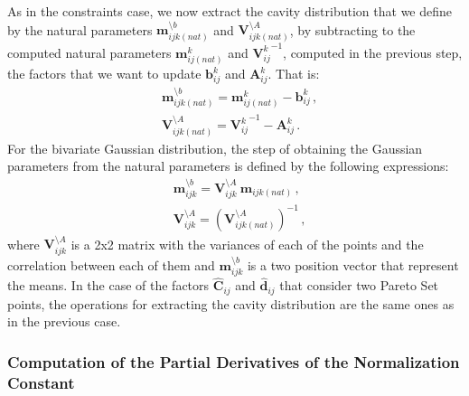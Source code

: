 As in the constraints case, we now extract the cavity distribution that we define by the natural parameters $\boldsymbol{m}_{ijk(nat)}^{\setminus b}$ and $\boldsymbol{V}_{ijk(nat)}^{\setminus A}$, by subtracting to the computed natural parameters $\boldsymbol{m}_{ij(nat)}^{k}$ and ${\boldsymbol{V}_{ij}^{k}}^{-1}$, computed in the previous step, the factors that we want to update $\boldsymbol{b}_{ij}^{k}$ and $\boldsymbol{A}_{ij}^{k}$. That is:
\begin{align}
    & \boldsymbol{m}_{ijk(nat)}^{\setminus b} = \boldsymbol{m}_{ij(nat)}^{k} - \boldsymbol{b}_{ij}^{k}\,, \nonumber \\
    & \boldsymbol{V}_{ijk(nat)}^{\setminus A} = {\boldsymbol{V}_{ij}^{k}}^{-1} - \boldsymbol{A}_{ij}^{k}\,.
\end{align}
For the bivariate Gaussian distribution, the step of obtaining the Gaussian parameters from the natural parameters is defined by the following expressions:
\begin{align}
    & \boldsymbol{m}_{ijk}^{\setminus b} = \boldsymbol{V}_{ijk}^{\setminus A}\ \boldsymbol{m}_{ijk(nat)}\,, \nonumber \\
    & \boldsymbol{V}_{ijk}^{\setminus A} = (\boldsymbol{V}_{ijk(nat)}^{\setminus A})^{-1}\,,
\end{align}
where $\boldsymbol{V}_{ijk}^{\setminus A}$ is a 2x2 matrix with the variances of each of the points and the correlation between each of them and $\boldsymbol{m}_{ijk}^{\setminus b}$ is a two position vector that represent the means. In the case of the factors $\hat{\boldsymbol{C}}_{ij}$ and $\hat{\boldsymbol{d}}_{ij}$ that consider two Pareto Set points, the operations for extracting the cavity distribution are the same ones as in the previous case.

\subsubsection{Computation of the Partial Derivatives of the Normalization Constant}

